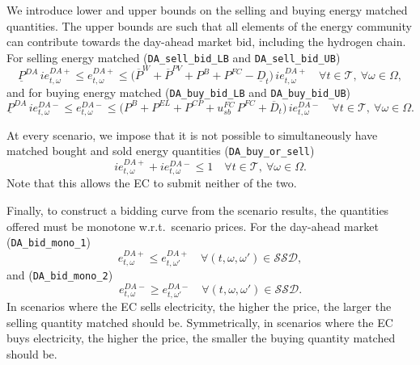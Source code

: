 \documentclass{article}
\begin{document}
We introduce lower and upper bounds on the selling and buying energy matched
quantities. The upper bounds are such that all elements of the energy community
can contribute towards the day-ahead market bid, including the hydrogen chain.
For selling energy matched (\verb|DA_sell_bid_LB| and \verb|DA_sell_bid_UB|)
\begin{equation} \label{EQ:DA_sell_bid_LB}
    \underline{P}^{DA}\, ie^{DA+}_{t, \omega}
    \leq e^{DA+}_{t, \omega}
    \leq \bigl(\overline{P}^W + \overline{P}^{PV} + P^B
               + P^{FC} - \underline{D}_t\bigr)\,
         ie^{DA+}_{t, \omega}
    \quad \forall t \in \mathcal{T},\ \forall \omega \in \Omega,
\end{equation}
and for buying energy matched (\verb|DA_buy_bid_LB| and \verb|DA_buy_bid_UB|)
\begin{equation} \label{EQ:DA_buy_bid_LB}
    \underline{P}^{DA}\, ie^{DA-}_{t, \omega}
    \leq e^{DA-}_{t, \omega}
    \leq \bigl(P^B + P^{EL} + P^{CP}
               + u_{sb}^{FC}\,P^{FC} + \overline{D}_t\bigr)\,
         ie^{DA-}_{t, \omega}
    \quad \forall t \in \mathcal{T},\ \forall \omega \in \Omega.
\end{equation}

At every scenario, we impose that it is not possible to simultaneously have
matched bought and sold energy quantities (\verb|DA_buy_or_sell|)
\begin{equation} \label{EQ:DA_buy_or_sell}
    ie^{DA+}_{t, \omega} + ie^{DA-}_{t, \omega} \leq 1
    \quad \forall t \in \mathcal{T},\ \forall \omega \in \Omega.
\end{equation}
Note that this allows the EC to submit neither of the two.

Finally, to construct a bidding curve from the scenario results, the quantities
offered must be monotone w.r.t.\ scenario prices.
For the day-ahead market (\verb|DA_bid_mono_1|)
\begin{equation} \label{EQ:DA_bid_mono_1}
    e^{DA+}_{t, \omega} \leq e^{DA+}_{t, \omega'}
    \quad \forall (t, \omega, \omega') \in \mathcal{SSD},
\end{equation}
and (\verb|DA_bid_mono_2|)
\begin{equation} \label{EQ:DA_bid_mono_2}
    e^{DA-}_{t, \omega} \geq e^{DA-}_{t, \omega'}
    \quad \forall (t, \omega, \omega') \in \mathcal{SSD}.
\end{equation}
In scenarios where the EC sells electricity, the higher the price, the larger
the selling quantity matched should be. Symmetrically, in scenarios where the EC
buys electricity, the higher the price, the smaller the buying quantity matched
should be.
\end{document}
